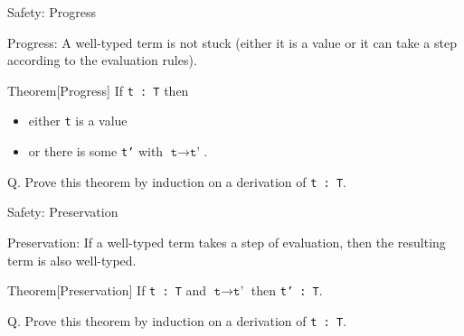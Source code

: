 \documentclass[table]{beamer}
\begin{document}
\begin{frame}[t]{Safety: Progress} \vspace{10pt}

Progress: A well-typed term is not stuck (either it is a value or it can take a step according to the evaluation rules).

\vspace{10pt}

Theorem[Progress] If \texttt{t : T} then 
\begin{itemize}
\item either \texttt{t} is a value 
\item or there is some \texttt{t'} with $\texttt{t}\rightarrow\texttt{t'}$.
\end{itemize}

\vspace{10pt}

Q. Prove this theorem by induction on a derivation of \texttt{t : T}.

\end{frame}

\begin{frame}[t]{Safety: Preservation} \vspace{10pt}

Preservation: If a well-typed term takes a step of evaluation, then the resulting term is also well-typed.

\vspace{10pt}

Theorem[Preservation] 
If \texttt{t : T} and $\texttt{t}\rightarrow\texttt{t'}$ then \texttt{t' : T}.

\vspace{10pt}

Q. Prove this theorem by induction on a derivation of \texttt{t : T}.

\end{frame}
\end{document}
